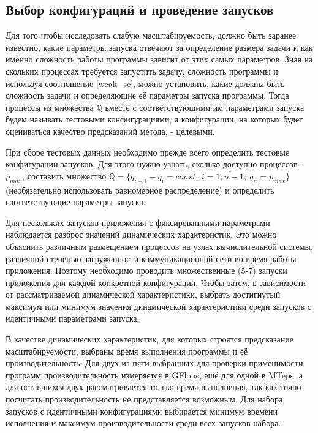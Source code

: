 	\subsection{Выбор конфигураций и проведение запусков}
		Для того чтобы исследовать слабую масштабируемость, должно быть заранее известно, какие параметры запуска отвечают за определение размера задачи и как именно сложность работы программы зависит от этих самых параметров. Зная на скольких процессах требуется запустить задачу, сложность программы и используя соотношение \eqref{weak_sc}, можно установить, какие должны быть сложность задачи и определяющие её параметры запуска программы. Тогда процессы из множества \(\mathbb{Q}\) вместе с соответствующими им параметрами запуска будем называть тестовыми конфигурациями, а конфигурации, на которых будет оцениваться качество предсказаний метода, - целевыми.

		При сборе тестовых данных необходимо прежде всего определить тестовые конфигурации запусков. Для этого нужно узнать, сколько доступно процессов - \(p_{max}\), составить множество \(\mathbb{Q} = \{q_{i + 1} - q_{i} = const,\ i = \overline{1,n - 1};\ q_n = p_{max}\}\) (необязательно использовать равномерное распределение) и определить соответствующие параметры запуска.


		Для нескольких запусков приложения с фиксированными параметрами наблюдается разброс значений динамических характеристик. Это можно объяснить различным размещением процессов на узлах вычислительной системы, различной степенью загруженности коммуникационной сети во время работы приложения. Поэтому необходимо проводить множественные (5-7) запуски приложения для каждой конкретной конфигурации. Чтобы затем, в зависимости от рассматриваемой динамической характеристики, выбрать достигнутый максимум или минимум значения динамической характеристики среди запусков с идентичными параметрами запуска.

		В качестве динамических характеристик, для которых строятся предсказание масштабируемости, выбраны время выполнения программы и её производительность. Для двух из пяти выбранных для проверки применимости программ производительность измеряется в GFlops, ещё для одной в MTeps, а для оставшихся двух рассматривается только время выполнения, так как точно посчитать производительность не представляется возможным. Для набора запусков с идентичными конфигурациями выбирается минимум времени исполнения и максимум производительности среди всех запусков набора.

